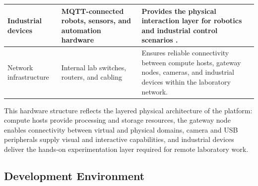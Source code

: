 \begin{longtable}{|p{3cm}|p{3.6cm}|p{8cm}|}
  Industrial devices         & MQTT-connected robots, sensors, and automation hardware    &
  Provides the physical interaction layer for robotics and industrial control
  scenarios {\footnotesize\cite{mqtt-oasis}}.                                                                     \\ \hline

  Network infrastructure     & Internal lab switches, routers, and cabling                & Ensures
  reliable connectivity between compute hosts, gateway nodes, cameras, and
  industrial devices within the laboratory network.                                                               \\ \hline
\end{longtable}
\normalsize

This hardware structure reflects the layered physical architecture of the
platform: compute hosts provide processing and storage resources, the gateway
node enables connectivity between virtual and physical domains, camera and USB
peripherals supply visual and interactive capabilities, and industrial devices
deliver the hands-on experimentation layer required for remote laboratory work.

\subsection{Development Environment}

